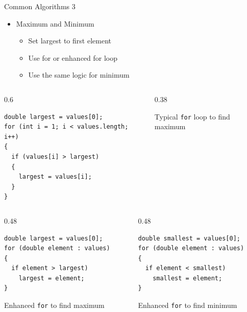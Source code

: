 \documentclass[aspectratio=43,10pt,t]{beamer}
\newcommand{\code}[1]{\texttt{#1}}
\newcommand{\callout}[2][\linewidth]{%
  {\setlength{\fboxsep}{3pt}\colorbox{callout}{%
    \parbox{\dimexpr#1-6pt\relax}{\raggedright\footnotesize #2}}}}
\begin{document}
\begin{frame}[fragile]{Common Algorithms 3}
  \begin{itemize}
    \item Maximum and Minimum
      \begin{itemize}
        \item Set largest to first element
        \item Use for or enhanced for loop
        \item Use the same logic for minimum
      \end{itemize}
  \end{itemize}
  \begin{columns}[c]
    \begin{column}{0.6\textwidth}
\begin{lstlisting}
double largest = values[0];
for (int i = 1; i < values.length; i++)
{
  if (values[i] > largest)
  {
    largest = values[i];
  }
}
\end{lstlisting}
    \end{column}
    \begin{column}{0.38\textwidth}
      \callout{Typical \code{for} loop to find maximum}
    \end{column}
  \end{columns}
  \begin{columns}[T]
    \begin{column}{0.48\textwidth}
\begin{lstlisting}
double largest = values[0];
for (double element : values)
{
  if element > largest)
    largest = element;
}
\end{lstlisting}
      \callout{Enhanced \code{for} to find maximum}
    \end{column}
    \begin{column}{0.48\textwidth}
\begin{lstlisting}
double smallest = values[0];
for (double element : values)
{
  if element < smallest)
    smallest = element;
}
\end{lstlisting}
      \callout{Enhanced \code{for} to find minimum}
    \end{column}
  \end{columns}
\end{frame}
\end{document}
